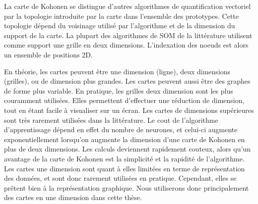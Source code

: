 La carte de Kohonen se distingue d'autres algorithmes de quantification vectoriel par la topologie introduite par la carte dans l'ensemble des prototypes. Cette topologie dépend du voisinage utilisé par l'algorithme et de la dimension du support de la carte.
La plupart des algorithmes de SOM de la littérature utilisent comme support une grille en deux dimensions. L'indexation des noeuds est alors un ensemble de positions 2D.


En théorie, les cartes peuvent être une dimension (ligne), deux dimensions (grilles), ou de dimension plus grandes. Les cartes peuvent aussi être des graphes de forme plus variable. En pratique, les grilles deux dimension sont les plus couramment utilisées. Elles permettent d'effectuer une réduction de dimension, tout en étant facile à visualiser sur un écran. Les cartes de dimensions supérieures sont très rarement utilisées dans la littérature. Le cout de l'algorithme d'apprentissage dépend en effet du nombre de neurones, et celui-ci augmente exponentiellement lorsqu'on augmente la dimension d'une carte de Kohonen en plus de deux dimensions. Les calculs deviennent rapidement couteux, alors qu'un avantage de la carte de Kohonen est la simplicité et la rapidité de l'algorithme. Les cartes une dimension sont quant à elles limitées en terme de représentation des données, et sont donc rarement utilisées en pratique. Cependant, elles se prêtent bien à la représentation graphique. Nous utiliserons donc principalement des cartes en une dimension dans cette thèse.


